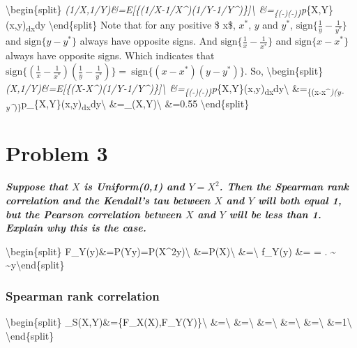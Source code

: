 \documentclass[11pt]{article}
\begin{document}
    \textbackslash{}begin\{split\}
\rho\emph{\tau(1/X,1/Y)\&=E{[}\{(1/X-1/X\^{}\emph{)(1/Y-1/Y\^{}})\}{]}\textbackslash{}
\&=\int\int\textsubscript{\{(-)(-)\}}p}\{X,Y\}(x,y)\textsubscript{dx}dy
\textbackslash{}end\{split\} Note that for any positive \$ x\$, \(x^*\),
\(y\) and \(y^*\), \(\text{sign}\{\frac{1}{y}-\frac{1}{y^*}\}\) and
\(\text{sign}\{y-y^*\}\) always have opposite signs. And
\(\text{sign}\{\frac{1}{x}-\frac{1}{x^*}\}\) and
\(\text{sign}\{x-x^*\}\) always have opposite signs. Which indicates
that
\(\text{sign}\{(\frac{1}{x}-\frac{1}{x^*})(\frac{1}{y}-\frac{1}{y^*})\} = ~\text{sign}\{(x-x^*)(y-y^*)\}\).
So, \textbackslash{}begin\{split\}
\rho\emph{\tau(X,1/Y)\&=E{[}\{(X-X\^{}\emph{)(1/Y-1/Y\^{}})\}{]}\textbackslash{}
\&=\int\int\textsubscript{\{(-)(-)\}}p}\{X,Y\}(x,y)\textsubscript{dx}dy\textbackslash{}
\&=\int\int\textsubscript{\{(x-x\^{}\emph{)(y-y\^{}})\}}p\_\{X,Y\}(x,y)\textsubscript{dx}dy\textbackslash{}
\&=\rho\_\tau(X,Y)\textbackslash{} \&=0.55 \textbackslash{}end\{split\}

    \hypertarget{problem-3}{%
\section{Problem 3}\label{problem-3}}

    \textbf{\emph{Suppose that \(X\) is Uniform(0,1) and \(Y = X^2\). Then
the Spearman rank correlation and the Kendall's tau between \(X\) and
\(Y\) will both equal 1, but the Pearson correlation between \(X\) and
\(Y\) will be less than 1. Explain why this is the case.}}

    \textbackslash{}begin\{split\}
F\_Y(y)\&=P(Y\leq y)=P(X\^{}2\leq y)\textbackslash{}
\&=P(X\leq {})\textbackslash{} \&=\textbackslash{} f\_Y(y)
\&=  = . \textasciitilde{}
\textasciitilde{}y\in [0,1]
\textbackslash{}end\{split\}

    \hypertarget{spearman-rank-correlation}{%
\subsubsection{Spearman rank
correlation}\label{spearman-rank-correlation}}

    \textbackslash{}begin\{split\}
\rho\_S(X,Y)\&=\{F\_X(X),F\_Y(Y)\}\textbackslash{}
\&=\textbackslash{}
\&=\textbackslash{}
\&=\textbackslash{}
\&=\textbackslash{}
\&=\textbackslash{}
\&=1\textbackslash{} \textbackslash{}end\{split\}
\end{document}
